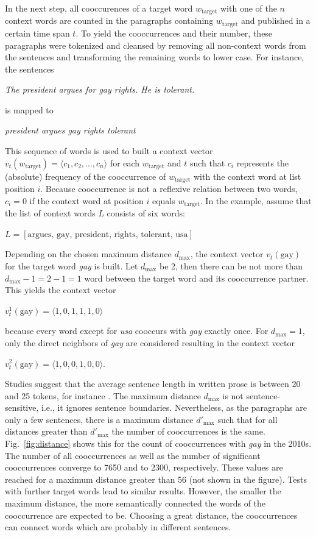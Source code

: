 \documentclass[10pt,a4paper,twocolumn]{scrartcl}
\begin{document}
In the next step, all cooccurences of a target word $w_\text{target}$ with one of the $n$ context words are counted in the paragraphs containing $w_\text{target}$ and published in a certain time span $t$. To yield the cooccurrences and their number, these paragraphs were tokenized and cleansed by removing all non-context words from the sentences and transforming the remaining words to lower case. For instance, the sentences \begin{center}\textit{The president argues for gay rights. He is tolerant.}\end{center} is mapped to \begin{center}\textit{president argues gay rights tolerant}\end{center} This sequence of words is used to built a context vector $v_t(w_\text{target}) = \langle c_1, c_2, \ldots, c_n\rangle$ for each $w_\text{target}$ and $t$ such that $c_i$ represents the (absolute) frequency of the cooccurrence of $w_\text{target}$ with the context word at list position $i$. Because cooccurrence is not a reflexive relation between two words, $c_i = 0$ if the context word at position $i$ equals $w_\text{target}$. In the example, assume that the list of context words $L$ consists of six words: \begin{center}$L =  [\text{argues, gay, president, rights, tolerant, usa}]$\end{center} Depending on the chosen maximum distance $d_\text{max}$, the context vector $v_t(\text{gay})$ for the target word \textit{gay} is built. Let $d_\text{max}$ be 2, then there can be not more than $d_\text{max} - 1 = 2 - 1 = 1$ word between the target word and its cooccurrence partner. This yields the context vector \begin{center}$v_t^1(\text{gay}) = \langle 1, 0, 1, 1, 1, 0\rangle$\end{center} because every word except for \textit{usa} cooccurs with \textit{gay} exactly once. For $d_\text{max} = 1$, only the direct neighbors of \textit{gay} are considered resulting in the context vector \begin{center}$v_t^2(\text{gay}) = \langle 1, 0, 0, 1, 0, 0\rangle$.\end{center} Studies suggest that the average sentence length in written prose is between 20 and 25 tokens, for instance \citep{Sichel:1974}. The maximum distance $d_\text{max}$ is not sentence-sensitive, i.e., it ignores sentence boundaries. Nevertheless, as the paragraphs are only a few sentences, there is a maximum distance $d'_\text{max}$ such that for all distances greater than $d'_\text{max}$ the number of cooccurrences is the same. Fig.~\ref{fig:distance} shows this for the count of cooccurrences with \textit{gay} in the 2010s. The number of all cooccurrences as well as the number of significant cooccurrences converge to 7650 and to 2300, respectively. These values are reached for a maximum distance greater than 56 (not shown in the figure). Tests with further target words lead to similar results. However, the smaller the maximum distance, the more semantically connected the words of the cooccurrence are expected to be. Choosing a great distance, the cooccurrences can connect words which are probably in different sentences. 
\end{document}
